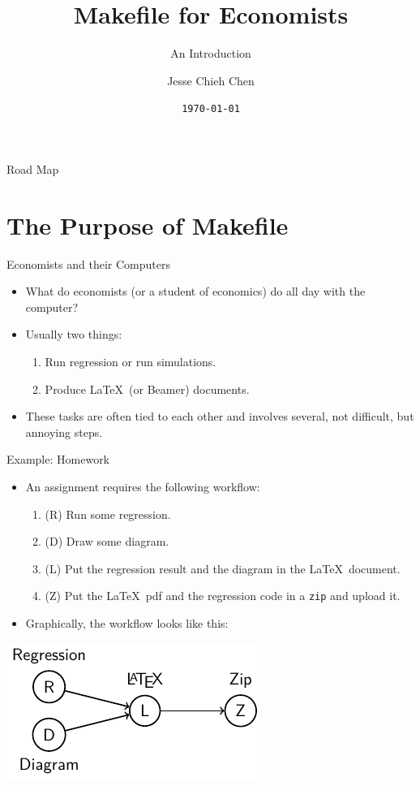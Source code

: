 \documentclass{beamer}
\title{\textbf{Makefile for Economists}}
\subtitle{An Introduction}
\author{Jesse Chieh Chen}
\date{\texttt{\today}}
\begin{document}
\begin{frame}{}
	\maketitle
\end{frame}

\begin{frame}{Road Map}
	\tableofcontents
\end{frame}

\section{The Purpose of Makefile}

\begin{frame}{Economists and their Computers}
	\begin{itemize}
		\item
			What do economists (or a student of economics) do all day with the computer?
			\pause
		\item
			Usually two things:
			\begin{enumerate}
				\item
					Run regression or run simulations.
				\item
					Produce \LaTeX\ (or Beamer) documents.
			\end{enumerate}
		\item
			These tasks are often tied to each other
			and involves several, not difficult, but annoying steps.
	\end{itemize}
\end{frame}

\begin{frame}{Example: Homework}
	\begin{itemize}
		\item
			An assignment requires the following workflow:
			\begin{enumerate}
				\item (R) Run some regression.
				\item (D) Draw some diagram.
				\item (L) Put the regression result and the diagram in the \LaTeX\ document.
				\item (Z) Put the \LaTeX\ pdf and the regression code in a \texttt{zip} and upload it.
			\end{enumerate}
		\item
			Graphically, the workflow looks like this:
	\end{itemize}
	\begin{center}
		\includegraphics[scale=1]{figures/homework-workflow.pdf}
	\end{center}
\end{frame}
\end{document}
